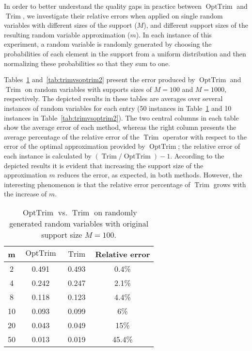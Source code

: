 \documentclass{article}
\DeclareMathOperator{\Trim}{Trim}
\DeclareMathOperator{\OptTrim}{OptTrim}
\begin{document}
In order to better understand the quality gaps in practice between $\OptTrim$ and $\Trim$, we investigate their relative errors when applied on single random variables with different sizes of the support ($M$), and different support sizes of the resulting random variable approximation ($m$). In each instance of this experiment, a random variable is randomly generated by choosing the probabilities of each element in the support from a uniform distribution and then normalizing these probabilities so that they sum to one.

Tables~\ref{tab:trimvsoptrim} and~\ref{tab:trimvsoptrim2} present the error produced by $\OptTrim$ and $\Trim$ on random variables with supports sizes of $M=100$ and $M=1000$, respectively. The depicted results in these tables are averages over several instances of random variables for each entry (50 instances in Table~\ref{tab:trimvsoptrim} and 10 instances in Table~\ref{tab:trimvsoptrim2}). The two central columns in each table show the average error of each method, whereas the right column presents the average percentage of the relative error of the $\Trim$ operator with respect to the error of the optimal approximation provided by $\OptTrim$; the relative error of each instance is calculated by $(\Trim/\OptTrim)-1$. According to the depicted results it is evident that increasing the support size of the approximation $m$ reduces the error, as expected, in both methods. However, the interesting phenomenon is that the relative error percentage of $\Trim$ grows with the increase of $m$.

\begin{table}[tbp]
	\scriptsize
	\centering
	\begin{tabular}{|c|c|c|c|}
		\hline
		m  & $\OptTrim$	& $\Trim$	& Relative error  \\ \hline
		2  & 0.491			& 0.493		& 0.4\%            \\ \hline
		4  & 0.242			& 0.247 	& 2.1\%            \\ \hline
		8  & 0.118 			& 0.123 	& 4.4\%            \\ \hline
		10 & 0.093			& 0.099		& 6\%              \\ \hline
		20 & 0.043			& 0.049		& 15\%             \\ \hline
		50 & 0.013 			& 0.019 	& 45.4\%           \\ \hline
	\end{tabular}
	\caption{$\OptTrim$ vs. $\Trim$ on randomly generated random variables with original support size $M=100$.}
	\label{tab:trimvsoptrim}
\end{table}
\end{document}
